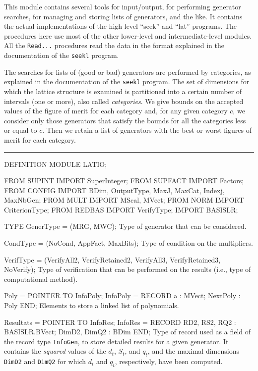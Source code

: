 
This module contains several tools for input/output,
for performing generator searches, for managing and storing lists
of generators, and the like.
It contains the actual implementations of the
high-level ``seek'' and ``lat'' programs.
The procedures here use most of the other 
lower-level and intermediate-level modules.
All the {\tt Read...} procedures read the data in the format
explained in the documentation of the {\tt seekl} program.

The searches for lists of (good or bad) generators are 
performed by categories, as explained in
the documentation of the {\tt seekl} program.
The set of dimensions for which the lattice structure is examined
is partitioned into a certain number of intervals (one or more),
also called {\em categories\/}.
We give bounds on the accepted values of the figure of merit
for each category and, for any given category $c$,
we consider only those generators that satisfy the bounds 
for all the categories less or equal to $c$.
Then we retain a list of generators with the best or worst figures of
merit for each category.


\bigskip\hrule
\code

DEFINITION MODULE LATIO;

FROM SUPINT   IMPORT SuperInteger;
FROM SUPFACT  IMPORT Factors;
FROM CONFIG   IMPORT BDim, OutputType, MaxJ, MaxCat, Indexj, MaxNbGen;
FROM MULT     IMPORT MScal, MVect;
FROM NORM     IMPORT CriterionType; 
FROM REDBAS   IMPORT VerifyType; 
IMPORT BASISLR;


TYPE
   GenerType   = (MRG, MWC);
\endcode
 \tabb Type of generator that can be considered. \endtabb
\code

   CondType    = (NoCond, AppFact, MaxBits);
\endcode
 \tabb Type of condition on the multipliers. \endtabb
\code

   VerifType   = (VerifyAll2, VerifyRetained2, 
                  VerifyAll3, VerifyRetained3, NoVerify);
\endcode
 \tabb Type of verification that can be performed on the results
    (i.e., type of computational method). \endtabb
\code

   Poly        = POINTER TO InfoPoly;
   InfoPoly    = RECORD
      a        : MVect;
      NextPoly : Poly
      END;
\endcode
 \tabb  Elements to store a linked list of polynomials.  \endtabb
\code

   Resultats   = POINTER TO InfoRes;
   InfoRes     = RECORD
      RD2, RS2, RQ2 : BASISLR.BVect;
      DimD2, DimQ2  : BDim
      END;
\endcode
 \tabb  Type of record used as a field of the record type {\tt InfoGen},
    to store detailed results for a given generator. 
    It contains the {\em squared\/} values of the $d_t$, $S_t$, and $q_t$,
    and the maximal dimensions {\tt DimD2} and {\tt DimQ2} 
    for which $d_t$ and $q_t$, respectively, have been computed.
 \endtabb
\code

